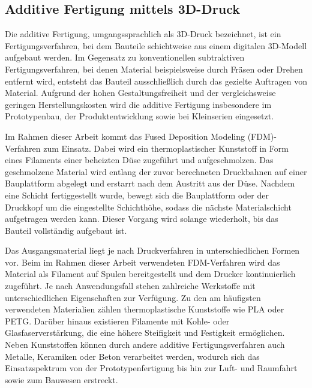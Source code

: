 \subsection{Additive Fertigung mittels 3D-Druck}

Die additive Fertigung, umgangssprachlich als 3D-Druck bezeichnet, ist ein Fertigungsverfahren, bei dem Bauteile schichtweise aus einem digitalen 3D-Modell aufgebaut werden. Im Gegensatz zu konventionellen subtraktiven Fertigungsverfahren, bei denen Material beispielsweise durch Fräsen oder Drehen entfernt wird, entsteht das Bauteil ausschließlich durch das gezielte Auftragen von Material. Aufgrund der hohen Gestaltungsfreiheit und der vergleichsweise geringen Herstellungskosten wird die additive Fertigung insbesondere im Prototypenbau, der Produktentwicklung sowie bei Kleinserien eingesetzt. \cite{gibson2021additive} \cite{iso52900}



Im Rahmen dieser Arbeit kommt das Fused Deposition Modeling (FDM)-Verfahren zum Einsatz. Dabei wird ein thermoplastischer Kunststoff in Form eines Filaments einer beheizten Düse zugeführt und aufgeschmolzen. Das geschmolzene Material wird entlang der zuvor berechneten Druckbahnen auf einer Bauplattform abgelegt und erstarrt nach dem Austritt aus der Düse. Nachdem eine Schicht fertiggestellt wurde, bewegt sich die Bauplattform oder der Druckkopf um die eingestellte Schichthöhe, sodass die nächste Materialschicht aufgetragen werden kann. Dieser Vorgang wird solange wiederholt, bis das Bauteil vollständig aufgebaut ist. \cite{gibson2021additive} 

Das Ausgangsmaterial liegt je nach Druckverfahren in unterschiedlichen Formen vor. Beim im Rahmen dieser Arbeit verwendeten FDM-Verfahren wird das Material als Filament auf Spulen bereitgestellt und dem Drucker kontinuierlich zugeführt. Je nach Anwendungsfall stehen zahlreiche Werkstoffe mit unterschiedlichen Eigenschaften zur Verfügung. Zu den am häufigsten verwendeten Materialien zählen thermoplastische Kunststoffe wie PLA oder PETG. Darüber hinaus existieren Filamente mit Kohle- oder Glasfaserverstärkung, die eine höhere Steifigkeit und Festigkeit ermöglichen.\cite{gibson2021additive}  Neben Kunststoffen können durch andere additive Fertigungsverfahren auch Metalle, Keramiken oder Beton verarbeitet werden, wodurch sich das Einsatzspektrum von der Prototypenfertigung bis hin zur Luft- und Raumfahrt sowie zum Bauwesen erstreckt. \cite{ahn2002anisotropic}

